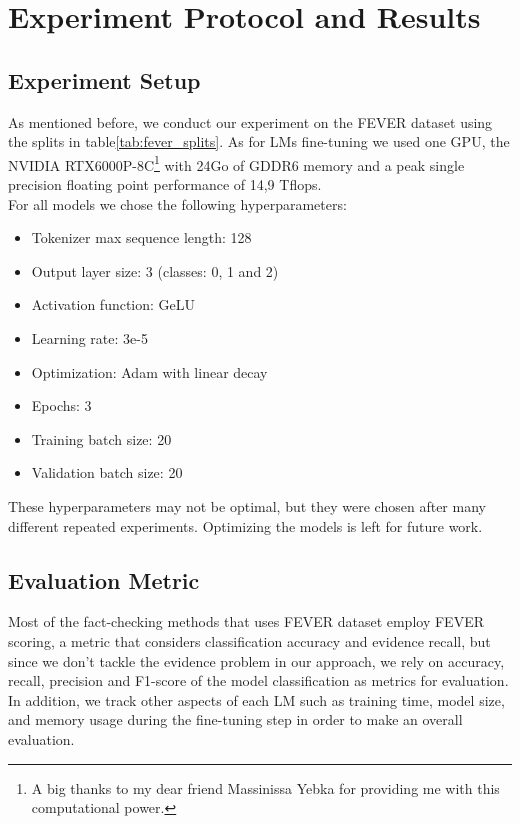 \documentclass[conference]{IEEEtran}
\begin{document}
\section{Experiment Protocol and Results}
\subsection{Experiment Setup}
As mentioned before, we conduct our experiment on the FEVER dataset using the splits in table\ref{tab:fever_splits}. As for LMs fine-tuning we used one GPU, the NVIDIA RTX6000P-8C\footnote{A big thanks to my dear friend Massinissa Yebka for providing me with this computational power.} with 24Go of GDDR6 memory and a peak single precision floating point performance of 14,9 Tflops.\\

For all models we chose the following hyperparameters:

\begin{itemize}
\item Tokenizer max sequence length: 128
\item Output layer size: 3 (classes: 0, 1 and 2)
\item Activation function: GeLU
\item Learning rate: 3e-5
\item Optimization: Adam with linear decay
\item Epochs: 3
\item Training batch size: 20
\item Validation batch size: 20\\
\end{itemize}

These hyperparameters may not be optimal, but they were chosen after many different repeated experiments. Optimizing the models is left for future work.
\subsection{Evaluation Metric}
Most of the fact-checking methods that uses FEVER dataset employ FEVER scoring\cite{thorne2018fever}, a metric that considers classification accuracy and evidence recall, but since we don't tackle the evidence problem in our approach, we rely on accuracy, recall, precision and F1-score of the model classification as metrics for evaluation.\\
In addition, we track other aspects of each LM such as training time, model size, and memory usage during the fine-tuning step in order to make an overall evaluation.
\end{document}
